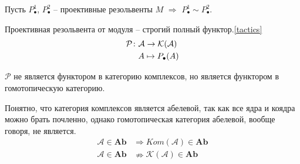 \documentclass[../main.tex]{subfiles}
\begin{document}
\begin{to_con}
Пусть $P^1_\bullet$, $P^2_\bullet$ -- проективные резольвенты $M$ $\Rightarrow$ $P^1_\bullet \sim P^2_\bullet$. 
\end{to_con}
\begin{to_con}
Проективная резольвента от модуля -- строгий полный функтор.\ref{tactics}
    \begin{align*}
        \mathcal{P}\colon&\mathcal{A} \to\mathcal{K(A)}\\
         &A \mapsto P_\bullet(A)
    \end{align*}
\end{to_con}
\begin{to_com}
$\mathcal{P}$ не является функтором в категорию комплексов, но является функтором в гомотопическую категорию.
\end{to_com}
\begin{to_com}
Понятно, что категория комплексов является абелевой, так как все ядра и коядра можно брать почленно, однако гомотопическая категория абелевой, вообще говоря, не является.
\begin{align*}
    \mathcal{A} \in \mathbf{Ab}&\Rightarrow Kom\mathcal{(A)}\in \mathbf{Ab}\\
    \mathcal{A} \in \mathbf{Ab}&\nRightarrow \mathcal{K(A)}\in \mathbf{Ab}
\end{align*}
\end{to_com}
\end{document}

